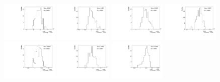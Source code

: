 \begin{figure}[h]\centering
    \includegraphics[width=0.24\textwidth]{figure/polarimetery/syst/bootstrap/output_stat_4600_alpha0.pdf}
    \includegraphics[width=0.24\textwidth]{figure/polarimetery/syst/bootstrap/output_stat_4612_alpha0.pdf}
    \includegraphics[width=0.24\textwidth]{figure/polarimetery/syst/bootstrap/output_stat_4626_alpha0.pdf}
    \includegraphics[width=0.24\textwidth]{figure/polarimetery/syst/bootstrap/output_stat_4640_alpha0.pdf}
    \includegraphics[width=0.24\textwidth]{figure/polarimetery/syst/bootstrap/output_stat_4660_alpha0.pdf}
    \includegraphics[width=0.24\textwidth]{figure/polarimetery/syst/bootstrap/output_stat_4680_alpha0.pdf}
    \includegraphics[width=0.24\textwidth]{figure/polarimetery/syst/bootstrap/output_stat_4700_alpha0.pdf}

\end{figure}
